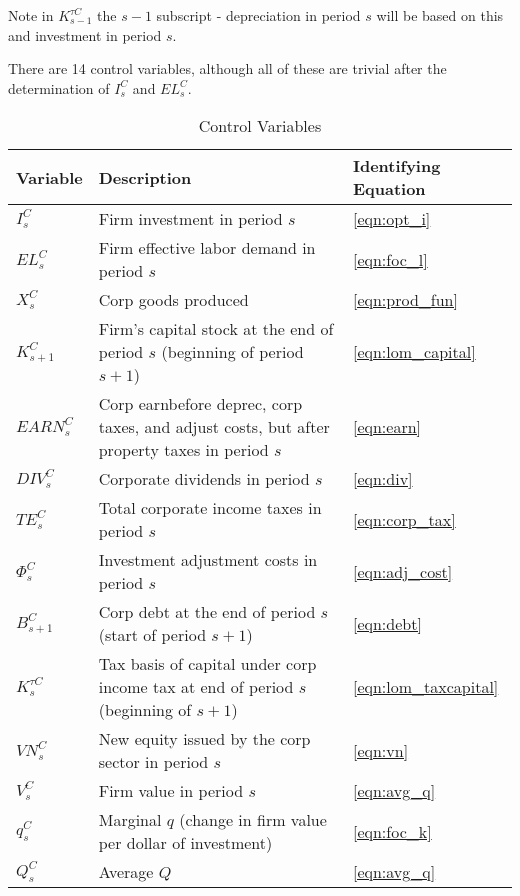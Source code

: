 Note in $K^{\tau C}_{s-1}$ the $s-1$ subscript - depreciation in period $s$ will be based on this and investment in period $s$.

There are 14 control variables, although all of these are trivial after the determination of $I^{C}_{s}$ and $EL^{C}_{s}$.

\begin{table}[htbp]
  \centering
  \caption{Control Variables}
    \begin{tabular}{lll}
    \hline
    \hline
    Variable & Description & Identifying Equation \\
    \hline
    $I^{C}_{s}$ & Firm investment in period $s$ & \ref{eqn:opt_i} \\
    $EL^{C}_{s}$ & Firm effective labor demand in period $s$ & \ref{eqn:foc_l} \\
    $X^{C}_{s}$ & Corp goods produced & \ref{eqn:prod_fun} \\
    $K^{C}_{s+1}$ & Firm's capital stock at the end of period $s$ (beginning of period $s+1$) & \ref{eqn:lom_capital} \\
    $EARN^{C}_{s}$ & Corp earnbefore deprec, corp taxes, and adjust costs, but after property taxes in period $s$ & \ref{eqn:earn} \\
    $DIV^{C}_{s}$ & Corporate dividends in period $s$ & \ref{eqn:div} \\
    $TE^{C}_{s}$ & Total corporate income taxes in period $s$ & \ref{eqn:corp_tax} \\
    $\Phi^{C}_{s}$ & Investment adjustment costs in period $s$ & \ref{eqn:adj_cost} \\
    $B^{C}_{s+1}$ & Corp debt at the end of period $s$ (start of period $s+1$) & \ref{eqn:debt} \\
    $K^{\tau C}_{s}$ & Tax basis of capital under corp income tax at end of period $s$ (beginning of $s+1$) & \ref{eqn:lom_taxcapital} \\
    $VN^{C}_{s}$ & New equity issued by the corp sector in period $s$ & \ref{eqn:vn} \\
    $V^{C}_{s}$ & Firm value in period $s$ & \ref{eqn:avg_q} \\
    $q^{C}_{s}$ & Marginal $q$ (change in firm value per dollar of investment) & \ref{eqn:foc_k} \\
    $Q^{C}_{s}$ & Average $Q$ & \ref{eqn:avg_q} \\
    \hline
    \hline
    \end{tabular}%
  \label{tab:control_vars}%
\end{table}%


